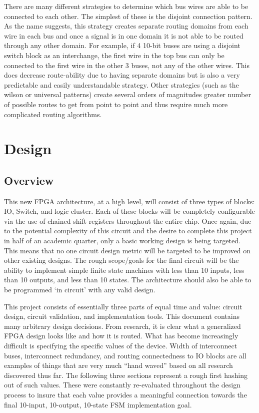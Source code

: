 \documentclass[12pt]{article}
\begin{document}
There are many different strategies to determine which bus wires are able to be connected 
to each other. The simplest of these is the disjoint connection pattern. As the name 
suggests, this strategy creates separate routing domains from each wire in each bus 
and once a signal is in one domain it is not able to be routed through any other 
domain. For example, if 4 10-bit buses are using a disjoint switch block as an interchange,
the first wire in the top bus can only be connected to the first wire in the other 
3 buses, not any of the other wires. This does decrease route-ability due to having 
separate domains but is also a very predictable and easily understandable strategy.
Other strategies (such as the wilson or universal patterns) create several orders 
of magnitudes greater number of possible routes to get from point to point and thus 
require much more complicated routing algorithms.

\section{Design}

\subsection{Overview}
This new FPGA architecture, at a high level, will consist of three types of blocks:
IO, Switch, and logic cluster. Each of these blocks will be completely configurable 
via the use of chained shift registers throughout the entire chip. Once again, due 
to the potential complexity of this circuit and the desire to complete this project 
in half of an academic quarter, only a basic working design is being targeted. This 
means that no one circuit design metric will be targeted to be improved on other 
existing designs. The rough scope/goals for the final circuit will be the ability 
to implement simple finite state machines with less than 10 inputs, less than 10 
outputs, and less than 10 states. The architecture should also be able to be programmed 
‘in circuit’ with any valid design.


This project consists of essentially three parts of equal time and value: circuit 
design, circuit validation, and implementation tools. This document contains many 
arbitrary design decisions. From research, it is clear what a generalized FPGA design 
looks like and how it is routed. What has become increasingly difficult is specifying 
the specific values of the device. Width of interconnect buses, interconnect redundancy,
and routing connectedness to IO blocks are all examples of things that are very 
much “hand waved” based on all research discovered thus far. The following three 
sections represent a rough first hashing out of such values. These were constantly 
re-evaluated throughout the design process to insure that each value provides a meaningful 
connection towards the final 10-input, 10-output, 10-state FSM implementation goal.
\end{document}
